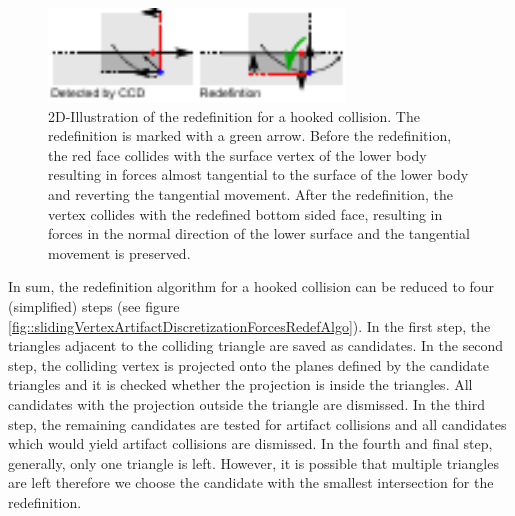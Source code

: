 \begin{figure}[h] 
  \centering
     \includegraphics[width=0.70\textwidth]{pics/pdf/slidingVertexArtifactDiscretizationForcesRedef.pdf}
  \caption[2D-Illustration of the redefinition for a hooked collision.]{2D-Illustration of the redefinition for a hooked collision. The redefinition is marked with a green arrow. Before the redefinition, the red face collides with the surface vertex of the lower body resulting in forces almost tangential to the surface of the lower body and reverting the tangential movement. After the redefinition, the vertex collides with the redefined bottom sided face, resulting in forces in the normal direction of the lower surface and the tangential movement is preserved.}
  \label{fig::slidingVertexArtifactDiscretizationForcesRedef}
\end{figure}

In sum, the redefinition algorithm for a hooked collision can be reduced to four (simplified) steps (see figure \ref{fig::slidingVertexArtifactDiscretizationForcesRedefAlgo}). In the first step, the triangles adjacent to the colliding triangle are saved as candidates. In the second step, the colliding vertex is projected onto the planes defined by the candidate triangles and it is checked whether the projection is inside the triangles. All candidates with the projection outside the triangle are dismissed. In the third step, the remaining candidates are tested for artifact collisions and all candidates which would yield artifact collisions are dismissed. In the fourth and final step, generally, only one triangle is left. However, it is possible that multiple triangles are left therefore we choose the candidate with the smallest intersection for the redefinition. 

